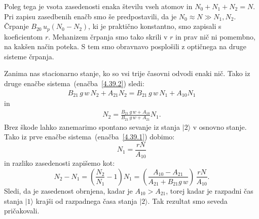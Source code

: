 Poleg tega je vsota zasedenosti enaka številu 
vseh atomov in $N_{0}+N_{1}+N_{2}=N$. Pri zapisu zasedbenih enačb smo še 
predpostavili, da je $N_0 \approx N \gg N_1, N_2$. Črpanje $B_{20}\, 
u_{p} (N_0-N_2)$, ki je praktično konstantno, smo zapisali s koeficientom $r$. 
Mehanizem črpanja 
smo tako skrili v $r$ in prav nič ni pomembno, na kakšen način 
poteka.
S tem smo obravnavo posplošili z optičnega na druge sisteme črpanja. 

Zanima nas stacionarno stanje, ko so vsi trije časovni odvodi enaki nič. 
Tako iz druge enačbe sistema~(enačba~\ref{4.39.2}) sledi:
\begin{eqnarray}
B_{21}\,g\,w\, N_{2}+A_{21}N_{2} = B_{21}\,g\,w\, N_{1} + A_{10}N_{1} 
\end{eqnarray}
in
\begin{eqnarray}
N_2 = \frac{B_{21}\,g\,w + A_{10}}{B_{21}\,g\,w+A_{21}}N_1.  
\end{eqnarray}
Brez škode lahko zanemarimo spontano sevanje iz stanja
$|2\rangle$ v osnovno stanje. Tako iz prve enačbe sistema~(enačba~\ref{4.39.1}) dobimo:
\begin{equation}
N_1= \frac{rN}{A_{10}}
\end{equation}
in razliko zasedenosti zapišemo kot:
\begin{equation}
N_{2}-N_{1}=\left(\frac{N_2}{N_1}-1\right)N_1=\left(\frac{A_{10}-A_{21}}{A_{21}+
B_{21}g\,w}\right)\,\frac{rN}{A_{10}}.
\label{4.42}
\end{equation}
Sledi, da je zasedenost obrnjena, 
kadar je $A_{10}>A_{21}$, torej kadar je
razpadni čas stanja $|1\rangle$ krajši od razpadnega časa stanja $|2\rangle$.
Tak rezultat smo seveda pričakovali.

